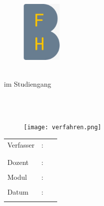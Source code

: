 \begin{titlepage}
\pagestyle{empty}

\begin{flushleft}
\begin{figure}[ht]
\flushleft
\includegraphics[height=3cm]{content/pictures/bfh_logo.jpeg}
\end{figure}
\end{flushleft}

\begin{center}
{\fontsize{18}{22} \selectfont \docKindOfWork}\\[5mm]
{\fontsize{18}{22} \selectfont im Studiengang} \\[5mm]
{\fontsize{18}{22} \selectfont \docFieldOfStudy}\\
\vspace{1cm}

\begin{onehalfspace}
{\fontsize{32}{24} \selectfont \docTitle}\\[7mm]
{\fontsize{18}{22} \selectfont \docSecondTitle}

\end{onehalfspace}
\end{center}

\begin{figure}[h!]
	\centering
	\texttt{[image: verfahren.png]}
\end{figure}

\vfill
\begin{center}
\begin{tabular}{lcl}
Verfasser	 	&:& \docPrenameA~\docSurnameA\\
				& & \docEmailA 	\\ \\
Dozent  		&:& \docFirstLector 	\\ \\
Modul	  		&:& \docModule 	\\ \\
Datum			&:& \docHandOverDate 	\\ \\

					
\end{tabular}
\end{center}
\end{titlepage}